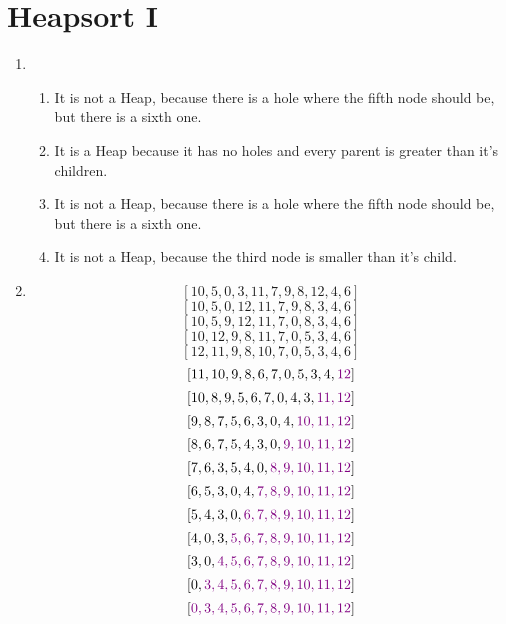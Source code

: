 \documentclass[sectionformat = exercise]{gadsescript}
\begin{document}
\maketitle
\section{Heapsort I}
\begin{enumerate}[label=\alph*)]
	\item 
		\begin{enumerate}[label=\Alph*.]
			\item It is not a Heap, because there is a hole where the fifth node should be, but there is a sixth one.
			\item It is a Heap because it has no holes and every parent is greater than it's children.
			\item It is not a Heap, because there is a hole where the fifth node should be, but there is a sixth one.
			\item It is not a Heap, because the third node is smaller than it's child.
		\end{enumerate}
	\item
		\[ [10, 5, 0, 3, 11, 7, 9, 8, 12, 4, 6] \]
		\[ [10, 5, 0, 12, 11, 7, 9, 8, 3, 4, 6] \]
		\[ [10, 5, 9, 12, 11, 7, 0, 8, 3, 4, 6] \]
		\[ [10, 12, 9, 8, 11, 7, 0, 5, 3, 4, 6] \]
		\[ [12, 11, 9, 8, 10, 7, 0, 5, 3, 4, 6] \]
		\[ [11, 10, 9, 8, 6, 7, 0, 5, 3, 4, {\color{violet} 12} ] \]
		\[ [10, 8, 9, 5, 6, 7, 0, 4, 3, {\color{violet} 11, 12} ] \]
		\[ [9, 8, 7, 5, 6, 3, 0, 4, {\color{violet} 10, 11, 12} ] \]
		\[ [8, 6, 7, 5, 4, 3, 0, {\color{violet} 9, 10, 11, 12} ] \]
		\[ [7, 6, 3, 5, 4, 0, {\color{violet} 8, 9, 10, 11, 12} ] \]
		\[ [6, 5, 3, 0, 4, {\color{violet} 7, 8, 9, 10, 11, 12} ] \]
		\[ [5, 4, 3, 0, {\color{violet} 6, 7, 8, 9, 10, 11, 12} ] \]
		\[ [4, 0, 3, {\color{violet} 5, 6, 7, 8, 9, 10, 11, 12} ] \]
		\[ [3, 0, {\color{violet} 4, 5, 6, 7, 8, 9, 10, 11, 12} ] \]
		\[ [0, {\color{violet} 3, 4, 5, 6, 7, 8, 9, 10, 11, 12} ] \]
		\[ [{\color{violet} 0, 3, 4, 5, 6, 7, 8, 9, 10, 11, 12} ] \]
\end{enumerate}
\end{document}
